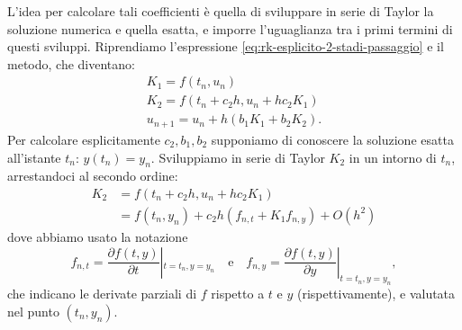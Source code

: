 L'idea per calcolare tali coefficienti è quella di sviluppare in serie di Taylor la soluzione numerica e quella esatta, e imporre l'uguaglianza tra i primi termini di questi sviluppi.
Riprendiamo l'espressione \eqref{eq:rk-esplicito-2-stadi-passaggio} e il metodo, che diventano:
\begin{equation*}
\begin{array}{ l }
K_{1} =f( t_{n} ,u_{n})\\
K_{2} =f( t_{n} +c_{2} h,u_{n} +hc_{2} K_{1})\\
u_{n+1} =u_{n} +h( b_{1} K_{1} +b_{2} K_{2}).
\end{array}
\end{equation*}
Per calcolare esplicitamente $c_{2} ,b_{1} ,b_{2}$ supponiamo di conoscere la soluzione esatta all'istante $t_{n}$: $y( t_{n}) =y_{n}$. Sviluppiamo in serie di Taylor $K_{2}$ in un intorno di $t_{n}$, arrestandoci al secondo ordine:
\begin{equation*}
\begin{aligned}
K_{2} & =f( t_{n} +c_{2} h,u_{n} +hc_{2} K_{1})\\
 & =f( t_{n} ,y_{n}) +c_{2} h( f_{n,t} +K_{1} f_{n,y}) +O\left( h^{2}\right)
\end{aligned}
\end{equation*}
dove abbiamo usato la notazione
$$ f_{n,t} =\frac{\partial f( t,y)}{\partial t} |_{t=t_{n} ,y=y_{n}} \quad \text{e} \quad f_{n,y} =\frac{\partial f( t,y)}{\partial y} |_{t=t_{n} ,y=y_{n}}, $$
che indicano le derivate parziali di $f$ rispetto a $t$ e $y$ (rispettivamente), e valutata nel punto $( t_{n} ,y_{n})$.

